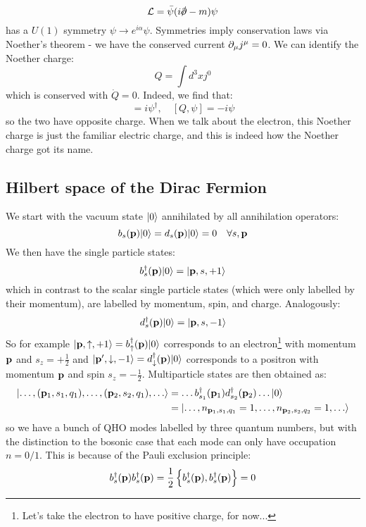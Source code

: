 \begin{equation}
    \mathcal{L} = \bar{\psi}(i\slashed{\p} - m)\psi
\end{equation}
has a $U(1)$ symmetry $\psi \to e^{i\alpha}\psi$. Symmetries imply conservation laws via Noether's theorem - we have the conserved current $\partial_\mu j^\mu = 0$. We can identify the Noether charge:
\begin{equation}
    Q = \int d^3x j^0
\end{equation}
which is conserved with $\dot{Q} = 0$. Indeed, we find that:
\begin{equation}
    [Q, \psi^\dag] = i\psi^\dag, \quad [Q, \psi] = -i\psi
\end{equation}
so the two have opposite charge. When we talk about the electron, this Noether charge is just the familiar electric charge, and this is indeed how the Noether charge got its name.

\subsection{Hilbert space of the Dirac Fermion}
We start with the vacuum state $\lvert 0 \rangle$ annihilated by all annihilation operators:
\begin{equation}
    b_s(\mathbf{p})\lvert 0 \rangle = d_s(\mathbf{p})\lvert 0 \rangle = 0 \quad \forall s, \mathbf{p}
\end{equation}
We then have the single particle states:
\begin{equation}
    b_s^\dagger(\mathbf{p})\lvert 0 \rangle = \lvert \mathbf{p}, s, +1 \rangle
\end{equation}
which in contrast to the scalar single particle states (which were only labelled by their momentum), are labelled by momentum, spin, and charge. Analogously:
\begin{equation}
    d_s^\dagger(\mathbf{p})\lvert 0 \rangle = \lvert \mathbf{p}, s, -1 \rangle
\end{equation}
So for example $\lvert \mathbf{p}, \uparrow, +1 \rangle = b^\dagger_{\uparrow}(\mathbf{p})\lvert 0 \rangle$ corresponds to an electron\footnote{Let's take the electron to have positive charge, for now...} with momentum $\mathbf{p}$ and $s_z = +\frac{1}{2}$ and $\lvert \mathbf{p}', \downarrow, -1 \rangle = d^\dagger_{\downarrow}(\mathbf{p})\lvert 0 \rangle$ corresponds to a positron with momentum $\mathbf{p}$ and spin $s_z = -\frac{1}{2}$. Multiparticle states are then obtained as:
\begin{equation}
    \begin{split}
        \lvert \ldots, (\mathbf{p}_1, s_1, q_1), \ldots, (\mathbf{p}_2, s_2, q_1), \ldots \rangle &= \ldots b^\dagger_{s_1}(\mathbf{p}_1)d^\dagger_{s_2}(\mathbf{p}_2)\ldots\lvert 0 \rangle
        \\ &= \lvert \ldots, n_{\mathbf{p}_1, s_1, q_1} = 1, \ldots, n_{\mathbf{p}_2, s_2, q_2} = 1, \ldots \rangle
    \end{split}
\end{equation}
so we have a bunch of QHO modes labelled by three quantum numbers, but with the distinction to the bosonic case that each mode can only have occupation $ n=0/1$. This is because of the Pauli exclusion principle:
\begin{equation}
    b_{s}^\dagger(\mathbf{p})b_s^\dagger(\mathbf{p}) = \frac{1}{2}\set{b_{s}^\dagger(\ensuremath{\mathbf{p}}), b_{s}^\dagger(\ensuremath{\mathbf{p}})} = 0
\end{equation}

